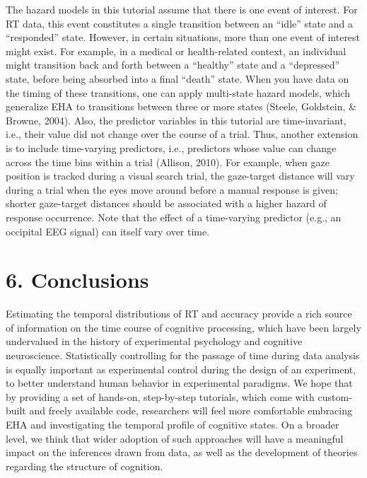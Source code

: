 \documentclass[
  man, donotrepeattitle,floatsintext]{apa6}
\begin{document}
The hazard models in this tutorial assume that there is one event of interest. For RT data, this event constitutes a single transition between an ``idle'' state and a ``responded'' state. However, in certain situations, more than one event of interest might exist. For example, in a medical or health-related context, an individual might transition back and forth between a ``healthy'' state and a ``depressed'' state, before being absorbed into a final ``death'' state. When you have data on the timing of these transitions, one can apply multi-state hazard models, which generalize EHA to transitions between three or more states (Steele, Goldstein, \& Browne, 2004).
Also, the predictor variables in this tutorial are time-invariant, i.e., their value did not change over the course of a trial. Thus, another extension is to include time-varying predictors, i.e., predictors whose value can change across the time bins within a trial (Allison, 2010). For example, when gaze position is tracked during a visual search trial, the gaze-target distance will vary during a trial when the eyes move around before a manual response is given; shorter gaze-target distances should be associated with a higher hazard of response occurrence. Note that the effect of a time-varying predictor (e.g., an occipital EEG signal) can itself vary over time.

\section{6. Conclusions}\label{conclusions}

Estimating the temporal distributions of RT and accuracy provide a rich source of information on the time course of cognitive processing, which have been largely undervalued in the history of experimental psychology and cognitive neuroscience. Statistically controlling for the passage of time during data analysis is equally important as experimental control during the design of an experiment, to better understand human behavior in experimental paradigms. We hope that by providing a set of hands-on, step-by-step tutorials, which come with custom-built and freely available code, researchers will feel more comfortable embracing EHA and investigating the temporal profile of cognitive states. On a broader level, we think that wider adoption of such approaches will have a meaningful impact on the inferences drawn from data, as well as the development of theories regarding the structure of cognition.

\newpage
\end{document}
